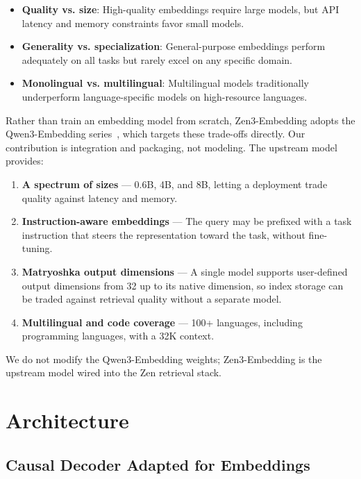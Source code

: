 \documentclass[11pt,a4paper]{article}
\begin{document}
\begin{itemize}
\item \textbf{Quality vs. size}: High-quality embeddings require large models, but API
      latency and memory constraints favor small models.
\item \textbf{Generality vs. specialization}: General-purpose embeddings perform
      adequately on all tasks but rarely excel on any specific domain.
\item \textbf{Monolingual vs. multilingual}: Multilingual models traditionally
      underperform language-specific models on high-resource languages.
\end{itemize}

Rather than train an embedding model from scratch, Zen3-Embedding adopts the Qwen3-Embedding
series~\cite{qwen3embedding}, which targets these trade-offs directly. Our contribution is
integration and packaging, not modeling. The upstream model provides:

\begin{enumerate}
\item \textbf{A spectrum of sizes} --- 0.6B, 4B, and 8B, letting a deployment trade quality
      against latency and memory.
\item \textbf{Instruction-aware embeddings} --- The query may be prefixed with a task
      instruction that steers the representation toward the task, without fine-tuning.
\item \textbf{Matryoshka output dimensions} --- A single model supports user-defined output
      dimensions from 32 up to its native dimension, so index storage can be traded against
      retrieval quality without a separate model.
\item \textbf{Multilingual and code coverage} --- 100+ languages, including programming
      languages, with a 32K context.
\end{enumerate}

We do not modify the Qwen3-Embedding weights; Zen3-Embedding is the upstream model wired into
the Zen retrieval stack.

\section{Architecture}
\label{sec:arch}

\subsection{Causal Decoder Adapted for Embeddings}
\end{document}
